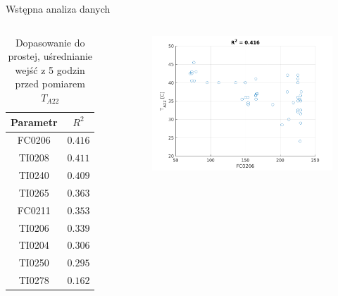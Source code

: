 \documentclass{beamer}
\begin{document}
\begin{frame}{Wstępna analiza danych}
\begin{columns}
\begin{table}[ht]
	\begin{tabular}{|c|c|}
 		\hline
		Parametr & $R^2$ \\
		\hline
		FC0206 & $0.416$ \\
		\hline
		TI0208 & $0.411$ \\
		\hline
		TI0240 & $0.409$\\
		\hline
		TI0265 & $0.363$\\
		\hline
 		FC0211 & $0.353$\\
		\hline
		TI0206 & $0.339$\\
		\hline
		TI0204 & $0.306$\\
		\hline
		TI0250 & $0.295$\\
		\hline
		TI0278 & $0.162$\\
		\hline
	\end{tabular}
	\caption{Dopasowanie do prostej, uśrednianie wejść z 5 godzin przed pomiarem $T_{A22}$}
\end{table}
\begin{figure}
	\includegraphics[width=\linewidth]{FC0206}
\end{figure}
\end{columns}
\end{frame}
\end{document}
